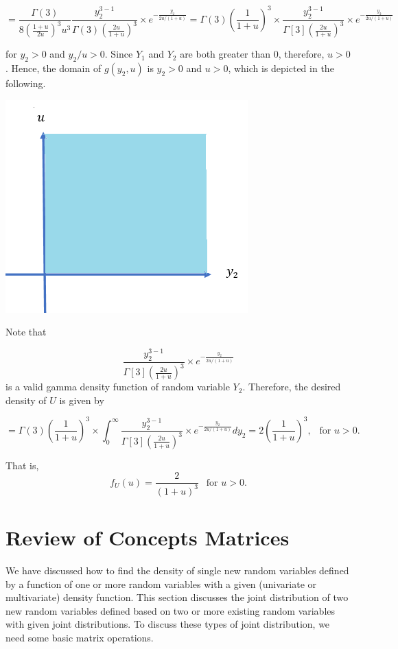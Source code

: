 \documentclass[
]{book}
\begin{document}
\[
=\frac{\Gamma(3)}{8\left(\frac{1+u}{2u} \right)^3 u^3} \frac{y_2^{3-1}}{\Gamma(3)\left(\frac{2u}{1+u} \right)^3 }\times e^{-\frac{y_2}{2u/(1+u)}} = \Gamma(3)\left(\frac{1}{1+u}\right)^3 \times \frac{y_2^{3-1}}{\Gamma[3]\left(\frac{2u}{1+u} \right)^3 }\times e^{-\frac{y_2}{2u/(1+u)}}
\]

for \(y_2 > 0\) and \(y_2/u > 0\). Since \(Y_1\) and \(Y_2\) are both greater than 0, therefore, \(u > 0\). Hence, the domain of \(g(y_2, u)\) is \(y_2 > 0\) and \(u > 0\), which is depicted in the following.

\begin{center}\includegraphics[width=0.4\linewidth]{topic11/example03Domain} \end{center}

Note that

\[
\frac{y_2^{3-1}}{\Gamma[3]\left(\frac{2u}{1+u} \right)^3 }\times e^{-\frac{y_2}{2u/(1+u)}}
\] is a valid gamma density function of random variable \(Y_2\). Therefore, the desired density of \(U\) is given by

\[
=\Gamma(3)\left(\frac{1}{1+u}\right)^3 \times \int_0^\infty \frac{y_2^{3-1}}{\Gamma[3]\left(\frac{2u}{1+u} \right)^3 }\times e^{-\frac{y_2}{2u/(1+u)}}dy_2 = 2\left(\frac{1}{1+u}\right)^3, \ \ \text{ for } u > 0.
\]

That is, \[
f_U(u) = \frac{2}{(1+u)^3} \ \ \text{ for } u > 0.
\]

\hypertarget{review-of-concepts-matrices}{%
\section{Review of Concepts Matrices}\label{review-of-concepts-matrices}}

We have discussed how to find the density of single new random variables defined by a function of one or more random variables with a given (univariate or multivariate) density function. This section discusses the joint distribution of two new random variables defined based on two or more existing random variables with given joint distributions. To discuss these types of joint distribution, we need some basic matrix operations.
\end{document}
